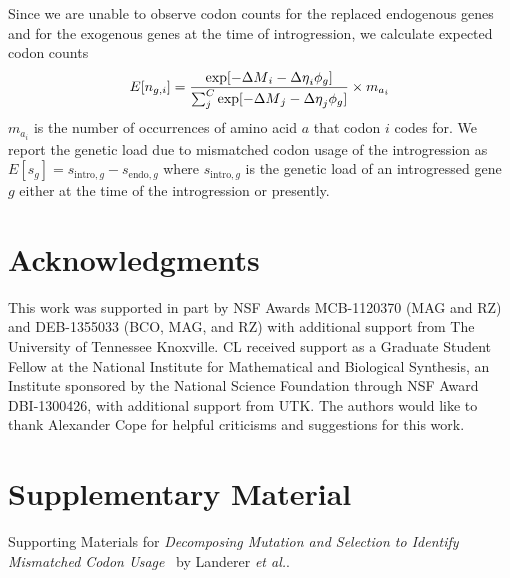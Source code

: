 \documentclass[fleqn,letterpaper]{article}
\newcommand\suppl{\par
  \setcounter{section}{0}%
  \setcounter{subsection}{0}%
  \setcounter{table}{0}%
  \setcounter{figure}{0}%
  \setcounter{equation}{0}%
  \gdef\thesection{\Alph{section}.1}%
  \def\thefigure{\Alph{section}\arabic{figure}}%
  \def\thetable{\Alph{section}\arabic{table}}%
  \def\theequation {\Alph{section}\arabic{equation}}}
\begin{document}
Since we are unable to observe codon counts for the replaced endogenous genes and for the exogenous genes at the time of introgression, we calculate expected codon counts
\begin{equation}
E[n_{g,i}] = \frac{\exp[-{\Delta M}_i -{\Delta \eta}_i\phi_g]}{\sum_j^C \exp[-{\Delta M}_j -{\Delta \eta}_j\phi_g]}\times m_{a_i}
\end{equation} 
$m_{a_i}$ is the number of occurrences of amino acid $a$ that codon $i$ codes for.
We report the genetic load due to mismatched codon usage of the introgression as $E[s_g] = s_{\text{intro},g} - s_{\text{endo},g}$ where $s_{\text{intro},g}$ is the genetic load of an introgressed gene $g$ either at the time of the introgression or presently.

\section*{Acknowledgments}

This work was supported in part by NSF Awards MCB-1120370 (MAG and RZ) and DEB-1355033 (BCO, MAG, and RZ) with additional support from The University of Tennessee Knoxville. 
CL received support as a Graduate Student Fellow at the National Institute for Mathematical and Biological Synthesis, an Institute sponsored by the National Science Foundation through NSF Award DBI-1300426, with additional support from UTK. 
The authors would like to thank 
Alexander Cope for helpful criticisms and suggestions for this work.






\clearpage
\pagebreak



\suppl

\setcounter{section}{19} %
\setcounter{page}{1}
\renewcommand{\thepage}{S\arabic{page}} %

\section*{Supplementary Material}

Supporting Materials for \emph{Decomposing Mutation and Selection to Identify Mismatched Codon Usage} \ by Landerer \emph{et al.}.
\end{document}
